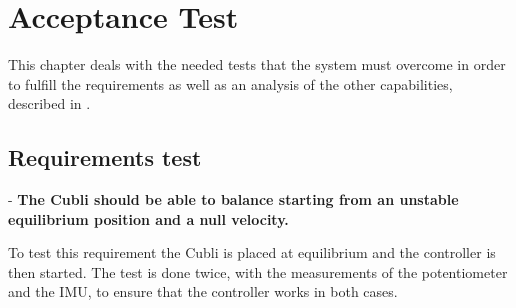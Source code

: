 \chapter{Acceptance Test}
This chapter deals with the needed tests that the system must overcome in order to fulfill the requirements as well as an analysis of the other capabilities, described in .

\section{Requirements test}

- \textbf{The Cubli should be able to balance starting from an unstable equilibrium position and a null velocity.}

To test this requirement the Cubli is placed at equilibrium and the controller is then started. The test is done twice, with the measurements of the potentiometer and the IMU, to ensure that the controller works in both cases.
%
